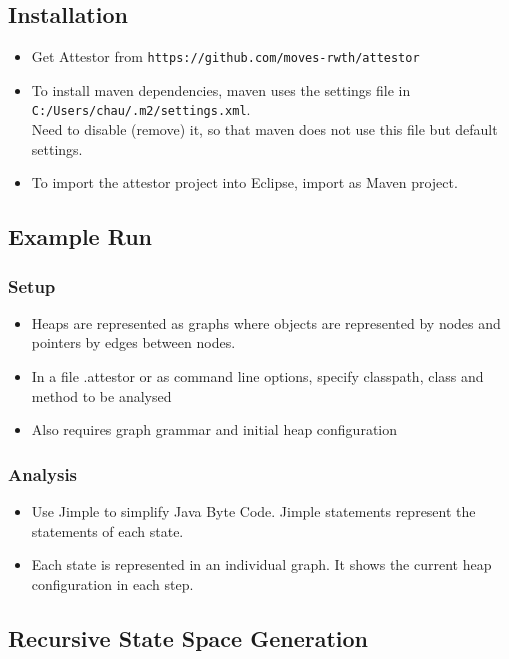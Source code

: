 \documentclass[a4paper,12pt]{article}
\begin{document}
\subsection{Installation}
\begin{itemize}
	\item Get Attestor from \texttt{https://github.com/moves-rwth/attestor}
	\item To install maven dependencies, maven uses the settings file in\\ \texttt{C:/Users/chau/.m2/settings.xml}. \\Need to disable (remove) it, so that maven does not use this file but default settings.
	\item To import the attestor project into Eclipse, import as Maven project.
\end{itemize}

\subsection{Example Run}

\subsubsection{Setup}
\begin{itemize}
	\item Heaps are represented as graphs where objects are represented by nodes and pointers by edges between nodes.
	\item In a file .attestor or as command line options, specify classpath, class and method to be analysed
	\item Also requires graph grammar and initial heap configuration
\end{itemize}

\subsubsection{Analysis}
\begin{itemize}
	\item Use Jimple to simplify Java Byte Code. Jimple statements represent the statements of each state.
	\item Each state is represented in an individual graph. It shows the current heap configuration in each step.
\end{itemize}

\subsection{Recursive State Space Generation}
\end{document}

